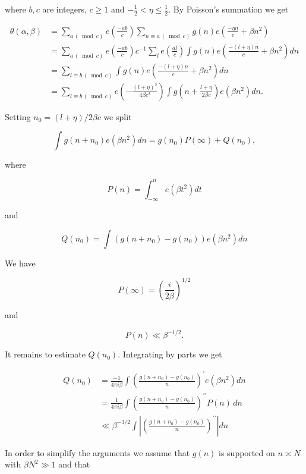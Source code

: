 \documentclass[10pt]{article}
\begin{document}
where $b, c$ are integers, $c \geqslant 1$ and $-\frac{1}{2}<\eta \leqslant \frac{1}{2}$. By Poisson's summation we get

$$
\begin{aligned}
\theta(\alpha, \beta) & =\sum_{a\, (\bmod c)} e\left(\frac{-a b}{c}\right) \sum_{n\equiv a\, (\bmod c)} g(n) e\left(\frac{-\eta n}{c}+\beta n^{2}\right) \\
& =\sum_{a\, (\bmod c)} e\left(\frac{-a b}{c}\right) c^{-1} \sum_{l} e\left(\frac{a l}{c}\right) \int g(n) e\left(\frac{-(l+\eta) n}{c}+\beta n^{2}\right) d n \\
& =\sum_{l\equiv b\, (\bmod c)}\int g(n) e\left(\frac{-(l+\eta) n}{c}+\beta n^{2}\right) d n \\
& =\sum_{l \equiv b\, (\bmod c)} e\left(-\frac{(l+\eta)^{2}}{4 \beta c^{2}}\right) \int g\left(n+\frac{l+\eta}{2 \beta c}\right) e\left(\beta n^{2}\right) d n .
\end{aligned}
$$

Setting $n_{0}=(l+\eta) / 2 \beta c$ we split

$$
\int g\left(n+n_{0}\right) e\left(\beta n^{2}\right) d n=g\left(n_{0}\right) P(\infty)+Q\left(n_{0}\right),
$$

where

$$
P(n)=\int_{-\infty}^{n} e\left(\beta t^{2}\right) d t
$$

and

$$
Q\left(n_{0}\right)=\int\left(g\left(n+n_{0}\right)-g\left(n_{0}\right)\right) e\left(\beta n^{2}\right) d n
$$

We have

$$
P(\infty)=\left(\frac{i}{2 \beta}\right)^{1 / 2}
$$

and

$$
P(n) \ll \beta^{-1 / 2} .
$$

It remains to estimate $Q\left(n_{0}\right)$. Integrating by parts we get

$$
\begin{aligned}
Q\left(n_{0}\right) & =\frac{-1}{4 \pi i \beta} \int\left(\frac{g\left(n+n_{0}\right)-g\left(n_{0}\right)}{n}\right)^{\prime} e\left(\beta n^{2}\right) d n \\
& =\frac{1}{4\pi i\beta}\int\left(\frac{g(n+n_{0})-g(n_{0})}{n}\right)^{\prime\prime}P(n)\,dn \\
& \ll \beta^{-3 / 2} \int\left|\left(\frac{g\left(n+n_{0}\right)-g\left(n_{0}\right)}{n}\right)^{\prime \prime}\right| d n
\end{aligned}
$$

In order to simplify the arguments we assume that $g(n)$ is supported on $n \asymp N$ with $\beta N^{2} \gg 1$ and that
\end{document}
